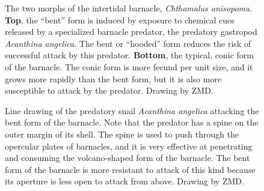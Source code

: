 \documentclass[
  letterpaper,
]{book}
\begin{document}
\begin{figure}


\caption[The two morphs of the intertidal barnacle, \emph{Chthamalus
anisopoma}]{\label{fig-3-2}The two morphs of the intertidal barnacle,
\emph{Chthamalus anisopoma}. \textbf{Top}, the ``bent'' form is induced
by exposure to chemical cues released by a specialized barnacle
predator, the predatory gastropod \emph{Acanthina angelica}. The bent or
``hooded'' form reduces the risk of successful attack by this predator.
\textbf{Bottom}, the typical, conic form of the barnacle. The conic form
is more fecund per unit size, and it grows more rapidly than the bent
form, but it is also more susceptible to attack by the predator. Drawing
by ZMD.}

\end{figure}%

\begin{figure}


\caption[Line drawing of the predatory snail \emph{Acanthina angelica}
attacking the bent form of the barnacle]{\label{fig-3-3}Line drawing of
the predatory snail \emph{Acanthina angelica} attacking the bent form of
the barnacle. Note that the predator has a spine on the outer margin of
its shell. The spine is used to push through the opercular plates of
barnacles, and it is very effective at penetrating and consuming the
volcano-shaped form of the barnacle. The bent form of the barnacle is
more resistant to attack of this kind because its aperture is less open
to attack from above. Drawing by ZMD.}

\end{figure}%
\end{document}
